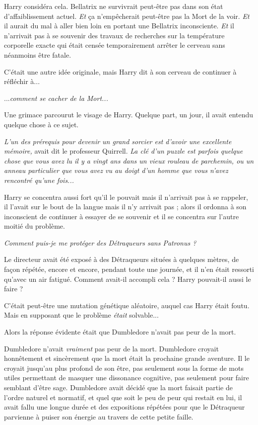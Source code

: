 Harry considéra cela. Bellatrix ne survivrait peut-être pas dans son état d'affaiblissement actuel. \emph{Et}  ça n'empêcherait peut-être pas la Mort de la voir.\emph{ Et } il aurait du mal à aller bien loin en portant une Bellatrix inconsciente. \emph{Et } il n'arrivait pas à se souvenir des travaux de recherches sur la température corporelle exacte qui était censée temporairement arrêter le cerveau sans néanmoins être fatale.

C'était une autre idée originale, mais Harry dit à son cerveau de continuer à réfléchir à...

...\emph{comment se cacher de la Mort...} 

Une grimace parcourut le visage de Harry. Quelque part, un jour, il avait entendu quelque chose à ce sujet.

\emph{L'un des prérequis pour devenir un grand sorcier est d'avoir une excellente mémoire, } avait dit le professeur Quirrell.\emph{ La clé d'un puzzle est parfois quelque chose que vous avez lu il y a vingt ans dans un vieux rouleau de parchemin, ou un anneau particulier que vous avez vu au doigt d'un homme que vous n'avez rencontré qu'une fois...} 

Harry se concentra aussi fort qu'il le pouvait mais il n'arrivait pas à se rappeler, il l'avait sur le bout de la langue mais il n'y arrivait pas ; alors il ordonna à son inconscient de continuer à essayer de se souvenir et il se concentra sur l'autre moitié du problème.

\emph{Comment puis-je me protéger des Détraqueurs sans Patronus ?} 

Le directeur avait été exposé à des Détraqueurs situées à quelques mètres, de façon répétée, encore et encore, pendant toute une journée, et il n'en était ressorti qu'avec un air fatigué. Comment avait-il accompli cela ? Harry pouvait-il aussi le faire ?

C'était peut-être une mutation génétique aléatoire, auquel cas Harry était foutu. Mais en supposant que le problème \emph{était}  solvable...

Alors la réponse évidente était que Dumbledore n'avait pas peur de la mort.

Dumbledore n'avait \emph{vraiment}  pas peur de la mort. Dumbledore croyait honnêtement et sincèrement que la mort était la prochaine grande aventure. Il le croyait jusqu'au plus profond de son être, pas seulement sous la forme de mots utiles permettant de masquer une dissonance cognitive, pas seulement pour faire semblant d'être sage. Dumbledore avait décidé que la mort faisait partie de l'ordre naturel et normatif, et quel que soit le peu de peur qui restait en lui, il avait fallu une longue durée et des expositions répétées pour que le Détraqueur parvienne à puiser son énergie au travers de cette petite faille.

